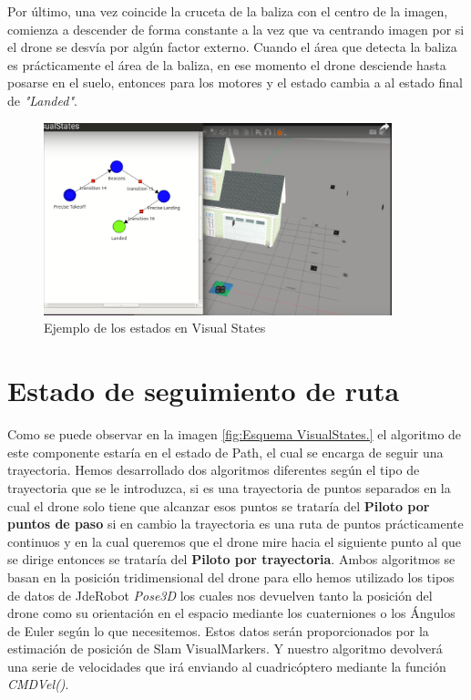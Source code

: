 \hspace{1cm} Por último, una vez coincide la cruceta de la baliza con el centro de la imagen, comienza a descender de forma constante a la vez que va centrando imagen por si el drone se desvía por algún factor externo. Cuando el área que detecta la baliza es prácticamente el área de la baliza, en ese momento el drone desciende hasta  posarse en el suelo, entonces para los motores y el estado cambia a al estado final de \textit{"Landed"}.

\begin{figure}[H]
	\begin{center}
		\includegraphics[width=0.9\textwidth]{imag/IMG34.png}
				\caption{Ejemplo de los estados en Visual States}
		\label{fig:Ejemplo Visual States.}	
	\end{center}
\end{figure}

\section{Estado de seguimiento de ruta}
\hspace{1cm} Como se puede observar en la imagen \ref{fig:Esquema VisualStates.} el algoritmo de este componente estaría en el estado de Path, el cual se encarga de seguir una trayectoria. Hemos desarrollado dos algoritmos diferentes según el tipo de trayectoria que se le introduzca, si es una trayectoria de puntos separados en la cual el drone solo tiene que alcanzar esos puntos se trataría del \textbf{Piloto por puntos de paso} si en cambio la trayectoria es una ruta de puntos prácticamente continuos y en la cual queremos que el drone mire hacia el siguiente punto al que se dirige entonces se trataría del \textbf{Piloto por trayectoria}. Ambos algoritmos se basan en la posición tridimensional del drone para ello hemos utilizado los tipos de datos de JdeRobot \textit{Pose3D} los cuales nos devuelven tanto la posición del drone como su orientación en el espacio mediante los cuaterniones o los Ángulos de Euler según lo que necesitemos. Estos datos serán proporcionados por la estimación de posición de Slam VisualMarkers. Y nuestro algoritmo devolverá una serie de velocidades que irá enviando al cuadricóptero mediante la función \textit{CMDVel()}.

